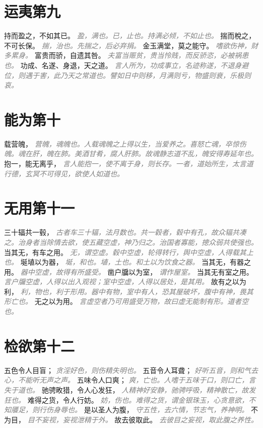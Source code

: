 \documentclass[a4paper,zihao=-4,oneside,landscape,UTF8]{ctexart}
\newcommand{\zhushi}[1]{\scriptsize{\textit{\textcolor{gray}{#1}}}\normalsize}
\begin{document}
\section{运夷第九}

持而盈之，不如其已。
\zhushi{盈，满也。已，止也。持满必倾，不如止也。}
揣而梲之，不可长保。
\zhushi{揣，治也。先揣之，后必弃捐。}
金玉满堂，莫之能守。
\zhushi{嗜欲伤神，财多累身。}
富贵而骄，自遗其咎。
\zhushi{夫富当赈贫，贵当怜贱，而反骄恣，必被祸患也。}
功成、名遂、身退，天之道。
\zhushi{言人所为，功成事立，名迹称遂，不退身避位，则遇于害，此乃天之常道也。譬如日中则移，月满则亏，物盛则衰，乐极则哀。}


\section{能为第十}

载营魄，
\zhushi{营魄，魂魄也。人载魂魄之上得以生，当爱养之。喜怒亡魂，卒惊伤魄。魂在肝，魄在肺。美酒甘肴，腐人肝肺。故魂静志道不乱，魄安得寿延年也。}
抱一，能无离乎，
\zhushi{言人能抱一，使不离于身，则长存。一者，道始所生，太言道行德，玄冥不可得见，欲使人如道也。}


\section{无用第十一}

三十辐共一毂，
\zhushi{古者车三十辐，法月数也。共一毂者，毂中有孔，故众辐共凑之。治身者当除情去欲，使五藏空虚，神乃归之。治国者寡能，摠众弱共使强也。}
当其无，有车之用。
\zhushi{无，谓空虚。毂中空虚，轮得转行，舆中空虚，人得载其上也。}
埏埴以为器，
\zhushi{埏，和也。埴，土也。和土以为饮食之器。}
当其无，有器之用。
\zhushi{器中空虚，故得有所盛受。}
凿户牖以为室，
\zhushi{谓作屋室。}
当其无有室之用。
\zhushi{言户牖空虚，人得以出入观视；室中空虚，人得以居处，是其用。}
故有之以为利，
\zhushi{利，物也，利于形用。器中有物，室中有人，恐其屋破坏，腹中有神，畏其形亡也。}
无之以为用。
\zhushi{言虚空者乃可用盛受万物，故曰虚无能制有形。道者空也。}


\section{检欲第十二}

五色令人目盲；
\zhushi{贪淫好色，则伤精失明也。}
五音令人耳聋；
\zhushi{好听五音，则和气去心，不能听无声之声。}
五味令人口爽；
\zhushi{爽，亡也。人嗜于五味于口，则口亡，言失于道也。}
驰骋畋猎，令人心发狂，
\zhushi{人精神好安静，驰骋呼吸，精神散亡，故发狂也。}
难得之货，令人行妨。
\zhushi{妨，伤也。难得之货，谓金银珠玉，心贪意欲，不知餍足，则行伤身辱也。}
是以圣人为腹，
\zhushi{守五性，去六情，节志气，养神明。}
不为目，
\zhushi{目不妄视，妄视泄精于外。}
故去彼取此。
\zhushi{去彼目之妄视，取此腹之养性。}
\end{document}
